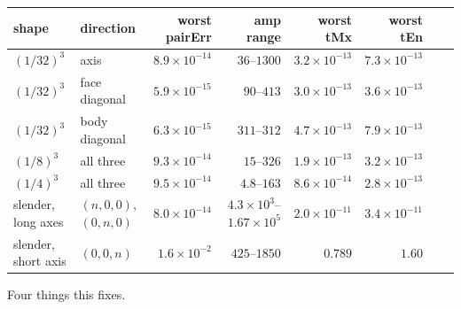 \begin{center}\footnotesize
\begin{tabular}{@{}llrrrrrr@{}}
\toprule
shape & direction & worst pairErr & amp range & worst tMx & worst tEn\\
\midrule
$(1/32)^3$ & axis & $8.9\times10^{-14}$ & $36$--$1300$ & $3.2\times10^{-13}$ & $7.3\times10^{-13}$\\
$(1/32)^3$ & face diagonal & $5.9\times10^{-15}$ & $90$--$413$ & $3.0\times10^{-13}$ & $3.6\times10^{-13}$\\
$(1/32)^3$ & body diagonal & $6.3\times10^{-15}$ & $311$--$312$ & $4.7\times10^{-13}$ & $7.9\times10^{-13}$\\
$(1/8)^3$ & all three & $9.3\times10^{-14}$ & $15$--$326$ & $1.9\times10^{-13}$ & $3.2\times10^{-13}$\\
$(1/4)^3$ & all three & $9.5\times10^{-14}$ & $4.8$--$163$ & $8.6\times10^{-14}$ & $2.8\times10^{-13}$\\
\midrule
slender, long axes & $(n,0,0)$, $(0,n,0)$ & $8.0\times10^{-14}$ &
$4.3\times10^{3}$--$1.67\times10^{5}$ & $2.0\times10^{-11}$ & $3.4\times10^{-11}$\\
slender, short axis & $(0,0,n)$ & $1.6\times10^{-2}$ & $425$--$1850$ & $0.789$ & $1.60$\\
\bottomrule
\end{tabular}
\end{center}

Four things this fixes.

